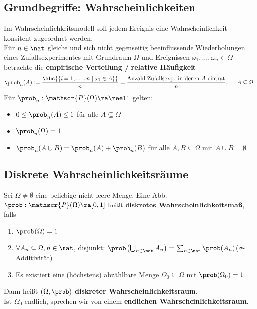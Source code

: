\documentclass{kit}
\begin{document}
  \subsection{Grundbegriffe: Wahrscheinlichkeiten}
    Im Wahrscheinlichkeitsmodell soll jedem Ereignis eine Wahrscheinlichkeit konsitent zugeordnet werden.\\
    Für $n\in\nat$ gleiche und sich nicht gegenseitig beeinflussende Wiederholungen eines Zufallsexperimentes mit Grundraum
    $\Omega$ und Ereignissen $\omega_1,\dots,\omega_n\in\Omega$ betrachte die \textbf{empirische Verteilung / relative
    Häufigkeit}
    $$\prob_n(A):=\frac{\abs{\{i=1,\dots,n\mid\omega_i\in A\}}}{n}=\frac{\text{Anzahl Zufallsexp. in denen $A$ 
    eintrat}}{n},\hspace{0.5cm}A\subseteq\Omega$$ \newpage
    Für $\prob_n:\mathscr{P}(\Omega)\ra\reell$ gelten:
    \begin{itemize}
      \item $0\le\prob_n(A)\le1$ für alle $A\subseteq\Omega$
      \item $\prob_n(\Omega)=1$
      \item $\prob_n(A\cup B)=\prob_n(A)+\prob_n(B)$ für alle $A,B\subseteq\Omega$ mit $A\cup B=\emptyset$
    \end{itemize}
  \subsection{Diskrete Wahrscheinlichkeitsräume}
    Sei $\Omega\neq\emptyset$ eine beliebige nicht-leere Menge. Eine Abb. $\prob:\mathscr{P}(\Omega)\ra[0,1]$ heißt 
    \textbf{diskretes Wahrscheinlichkeitsmaß}, falls
    \begin{enumerate}
      \item $\prob(\Omega)=1$
      \item $\forall A_n\subseteq\Omega,n\in\nat$, disjunkt: $\prob\left(\bigcup_{n\in\nat}A_n\right)
        =\sum_{n\in\nat}\prob(A_n)$\hspace{0.5cm}($\sigma$-Additivität)
      \item Es existiert eine (höchstens) abzählbare Menge $\Omega_0\subseteq\Omega$ mit $\prob(\Omega_0)=1$
    \end{enumerate}
    Dann heißt $(\Omega,\prob)$ \textbf{diskreter Wahrscheinlichkeitsraum}.\\
    Ist $\Omega_0$ endlich, sprechen wir von einem \textbf{endlichen Wahrscheinlichkeitsraum}.
\end{document}
